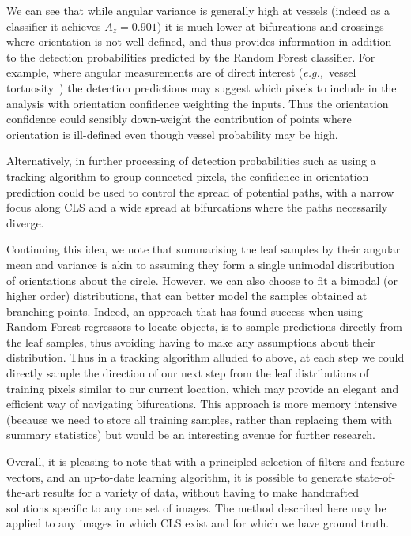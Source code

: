 \documentclass{IEEEtran}
\def\eg{\emph{e.g.,}}
\begin{document}
We can see that while angular variance is generally high at vessels (indeed as a classifier it achieves $A_z = 0.901$) it is much lower at bifurcations and crossings where orientation is not well defined, and thus provides information in addition to the detection probabilities predicted by the Random Forest classifier. For example, where angular measurements are of direct interest (\eg~vessel tortuosity~\cite{Hart_etal_IJMI99}) the detection predictions may suggest which pixels to include in the analysis with orientation confidence weighting the inputs. Thus the orientation confidence could sensibly down-weight the contribution of points where orientation is ill-defined even though vessel probability may be high.

Alternatively, in further processing of detection probabilities such as using a tracking algorithm to group connected pixels, the confidence in orientation prediction could be used to control the spread of potential paths, with a narrow focus along CLS and a wide spread at bifurcations where the paths necessarily diverge.

Continuing this idea, we note that summarising the leaf samples by their angular mean and variance is akin to assuming they form a single unimodal distribution of orientations about the circle. However, we can also choose to fit a bimodal (or higher order) distributions, that can better model the samples obtained at branching points. Indeed, an approach that has found success when using Random Forest regressors to locate objects, is to sample predictions directly from the leaf samples, thus avoiding having to make any assumptions about their distribution. Thus in a tracking algorithm alluded to above, at each step we could directly sample the direction of our next step from the leaf distributions of training pixels similar to our current location, which may provide an elegant and efficient way of navigating bifurcations. This approach is more memory intensive (because we need to store all training samples, rather than replacing them with summary statistics) but would be an interesting avenue for further research.

Overall, it is pleasing to note that with a principled selection of filters and feature vectors, and an up-to-date learning algorithm, it is possible to generate state-of-the-art results for a variety of data, without having to make handcrafted solutions specific to any one set of images. The method described here may be applied to any images in which CLS exist and for which we have ground truth.
\end{document}
